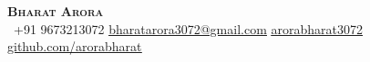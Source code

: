 \begin{center}
    \textbf{\Huge \scshape Bharat Arora} \\ \vspace{1pt}
     \ \small +91 9673213072 \quad
    \href{mailto:fibharatarora3072stlast@gmail.com}{ \underline{bharatarora3072@gmail.com}} \quad
    \href{www.linkedin.com/in/arorabharat3072}{ \underline{arorabharat3072}} \quad
    \href{https://github.com/arorabharat}{ \underline{github.com/arorabharat}}
\end{center}